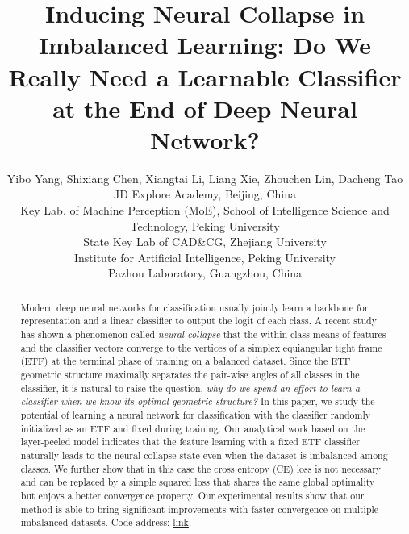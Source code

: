 \documentclass{article}
\newcommand{\<}{\left\langle}
\renewcommand{\>}{\right\rangle}
\begin{document}
\title{{Inducing Neural Collapse in Imbalanced Learning: Do We Really Need a Learnable Classifier at the End of Deep Neural Network?}}


\author{Yibo Yang, Shixiang Chen, Xiangtai Li, Liang Xie, Zhouchen Lin, Dacheng Tao\vspace{1mm} \\
\small{JD Explore Academy, Beijing, China}\\
\small{Key Lab. of Machine Perception (MoE), School of Intelligence Science and Technology, Peking University}\\
\small{State Key Lab of CAD\&CG, Zhejiang University}\\
\small{Institute for Artificial Intelligence, Peking University}\\
\small{Pazhou Laboratory, Guangzhou, China}\\
}

\maketitle





{\let\thefootnote\relax{}}

\vspace{-4mm}
\begin{abstract}
	\vspace{-2mm}
	Modern deep neural networks for classification usually jointly learn a backbone for representation and a linear classifier to output the logit of each class. A recent study has shown a phenomenon called \emph{neural collapse} that the within-class means of features and the classifier vectors converge to the vertices of a simplex equiangular tight frame (ETF) at the terminal phase of training on a balanced dataset. Since the ETF geometric structure maximally separates the pair-wise angles of all classes in the classifier, it is natural to raise the question, \emph{why do we spend an effort to learn a classifier when we know its optimal geometric structure?} In this paper, we study the potential of learning a neural network for classification with the classifier randomly initialized as an ETF and fixed during training. Our analytical work based on the layer-peeled model indicates that the feature learning with a fixed ETF classifier naturally leads to the neural collapse state even when the dataset is imbalanced among classes. We further show that in this case the cross entropy (CE) loss is not necessary and can be replaced by a simple squared loss that shares the same global optimality but enjoys a better convergence property. Our experimental results show that our method is able to bring significant improvements with faster convergence on multiple imbalanced datasets. Code address: \href{https://github.com/NeuralCollapseApplications/ImbalancedLearning}{link}.
	
	


\end{abstract}
\end{document}
